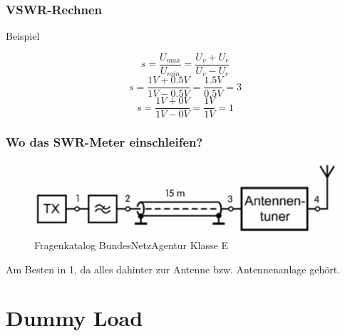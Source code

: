\begin{frame}
  \frametitle{VSWR-Rechnen}
  \begin{exampleblock}{Beispiel}
    \begin{center}
      $$s = \frac{U_{max}}{U_{min}} = \frac{U_v + U_r}{U_v - U_r}$$
      $$s = \frac{1V + 0.5V}{1V - 0.5V} = \frac{1.5V}{0.5V} = 3$$
      $$s = \frac{1V + 0V}{1V - 0V} = \frac{1V}{1V} = 1$$
    \end{center}
  \end{exampleblock}
\end{frame}



\begin{frame}
  \frametitle{Wo das SWR-Meter einschleifen?}
  \begin{figure}
    \includegraphics[width=.97\textwidth,height=.4\textheight,keepaspectratio]{e17/SWROrt.png}
    \caption{Fragenkatalog BundesNetzAgentur Klasse E}
  \end{figure}
  \pause
  Am Besten in 1, da alles dahinter zur Antenne bzw. Antennenanlage gehört.
\end{frame}


\section*{Dummy Load}


